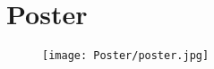 \section{Poster}
	\begin{figure}[H]
		\texttt{[image: Poster/poster.jpg]}
		\centering
	\end{figure}
 \newpage
